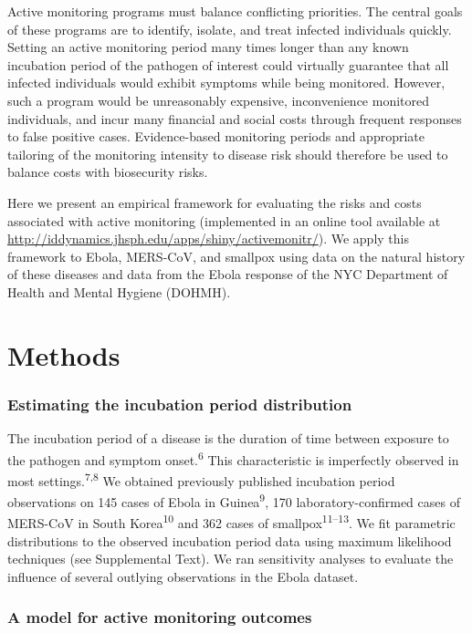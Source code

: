 \documentclass[]{article}
\begin{document}
Active monitoring programs must balance conflicting priorities. The
central goals of these programs are to identify, isolate, and treat
infected individuals quickly. Setting an active monitoring period many
times longer than any known incubation period of the pathogen of
interest could virtually guarantee that all infected individuals would
exhibit symptoms while being monitored. However, such a program would be
unreasonably expensive, inconvenience monitored individuals, and incur
many financial and social costs through frequent responses to false
positive cases. Evidence-based monitoring periods and appropriate
tailoring of the monitoring intensity to disease risk should therefore
be used to balance costs with biosecurity risks.

Here we present an empirical framework for evaluating the risks and
costs associated with active monitoring (implemented in an online tool
available at
\url{http://iddynamics.jhsph.edu/apps/shiny/activemonitr/}). We apply
this framework to Ebola, MERS-CoV, and smallpox using data on the
natural history of these diseases and data from the Ebola response of
the NYC Department of Health and Mental Hygiene (DOHMH).

\section{Methods}\label{methods}

\subsubsection{Estimating the incubation period
distribution}\label{estimating-the-incubation-period-distribution}

The incubation period of a disease is the duration of time between
exposure to the pathogen and symptom onset.\textsuperscript{6} This
characteristic is imperfectly observed in most
settings.\textsuperscript{7,8} We obtained previously published
incubation period observations on 145 cases of Ebola in
Guinea\textsuperscript{9}, 170 laboratory-confirmed cases of MERS-CoV in
South Korea\textsuperscript{10} and 362 cases of
smallpox\textsuperscript{11--13}. We fit parametric distributions to the
observed incubation period data using maximum likelihood techniques (see
Supplemental Text). We ran sensitivity analyses to evaluate the
influence of several outlying observations in the Ebola dataset.

\subsubsection{A model for active monitoring
outcomes}\label{a-model-for-active-monitoring-outcomes}
\end{document}

